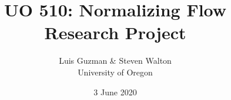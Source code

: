 \documentclass[pdf,11pt]{beamer}
\title{UO 510: Normalizing Flow Research Project
}
\author{Luis Guzman \& Steven Walton\\ \small University of Oregon}
\date{3 June 2020}
\begin{document}
\frame{\titlepage}








\end{document}
